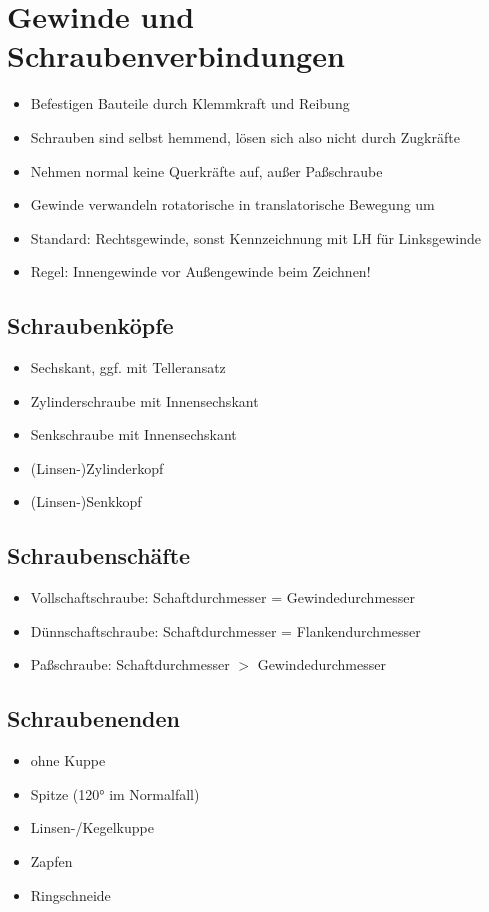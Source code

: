 \documentclass[a4paper,parskip=half*,DIV=7,fontsize=11pt]{scrartcl}
\begin{document}
\section{Gewinde und Schraubenverbindungen}
\begin{itemize}
	\item Befestigen Bauteile durch Klemmkraft und Reibung
	\item Schrauben sind selbst hemmend, lösen sich also nicht durch Zugkräfte
	\item Nehmen normal keine Querkräfte auf, außer Paßschraube
	\item Gewinde verwandeln rotatorische in translatorische Bewegung um
	\item Standard: Rechtsgewinde, sonst Kennzeichnung mit LH für Linksgewinde
	\item Regel: Innengewinde vor Außengewinde beim Zeichnen!
\end{itemize}
		
\subsection{Schraubenköpfe}
\begin{itemize}
	\item Sechskant, ggf. mit Telleransatz
	\item Zylinderschraube mit Innensechskant
	\item Senkschraube mit Innensechskant
	\item (Linsen-)Zylinderkopf
	\item (Linsen-)Senkkopf
\end{itemize}
	
\subsection{Schraubenschäfte}
\begin{itemize}
	\item Vollschaftschraube: Schaftdurchmesser =
	      Gewindedurchmesser 
	\item Dünnschaftschraube: Schaftdurchmesser =
	      Flankendurchmesser 
	\item Paßschraube: Schaftdurchmesser $>$ Gewindedurchmesser 
\end{itemize}
	
\subsection{Schraubenenden}
\begin{itemize}
	\item ohne Kuppe
	\item Spitze (120° im Normalfall)
	\item Linsen-/Kegelkuppe
	\item Zapfen
	\item Ringschneide
\end{itemize}
	
\end{document}
